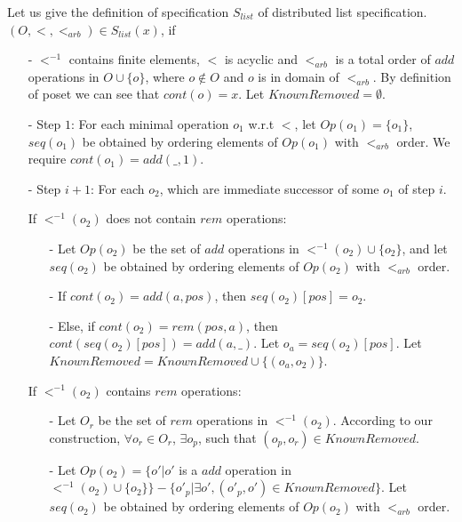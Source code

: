 Let us give the definition of specification $S_{\textit{list}}$ of distributed list specification. $(O,<,<_{\textit{arb}}) \in S_{\textit{list}}(x)$, if

\begin{itemize}
\setlength{\itemsep}{0.5pt}
\item[-] $<^{-1}$ contains finite elements, $<$ is acyclic and $<_{\textit{arb}}$ is a total order of $add$ operations in $O \cup \{ o \}$, where $o \notin O$ and $o$ is in domain of $<_{\textit{arb}}$. By definition of poset we can see that $cont(o)=x$. Let $KnownRemoved=\emptyset$.

\item[-] Step $1$: For each minimal operation $o_1$ w.r.t $<$, let $Op(o_1)=\{ o_1 \}$, $seq(o_1)$ be obtained by ordering elements of $Op(o_1)$ with $<_{\textit{arb}}$ order. We require $cont(o_1)=add(\_,1)$.

\item[-] Step $i+1$: For each $o_2$, which are immediate successor of some $o_1$ of step $i$.

    If $<^{-1}(o_2)$ does not contain $rem$ operations:

    \begin{itemize}
    \setlength{\itemsep}{0.5pt}
    \item[-] Let $Op(o_2)$ be the set of $add$ operations in $<^{-1}(o_2) \cup \{ o_2 \}$, and let $seq(o_2)$ be obtained by ordering elements of $Op(o_2)$ with $<_{\textit{arb}}$ order.

    \item[-] If $cont(o_2) = add(a,pos)$, then $seq(o_2)[pos] = o_2$.

    \item[-] Else, if $cont(o_2) = rem(pos,a)$, then $cont(seq(o_2)[pos])=add(a,\_)$. Let $o_a=seq(o_2)[pos]$. Let $KnownRemoved = KnownRemoved \cup \{ (o_a,o_2) \}$.
    \end{itemize}

    If $<^{-1}(o_2)$ contains $rem$ operations:

    \begin{itemize}
    \setlength{\itemsep}{0.5pt}
    \item[-] Let $O_r$ be the set of $rem$ operations in $<^{-1}(o_2)$. According to our construction, $\forall o_r \in O_r$, $\exists o_p$, such that $(o_p,o_r) \in KnownRemoved$.

    \item[-] Let $Op(o_2) = \{ o' \vert o'$ is a $add$ operation in $<^{-1}(o_2) \cup \{ o_2 \} \} - \{ o'_p \vert \exists o', (o'_p,o') \in KnownRemoved \}$. Let $seq(o_2)$ be obtained by ordering elements of $Op(o_2)$ with $<_{\textit{arb}}$ order.


\end{itemize}
\end{itemize}

